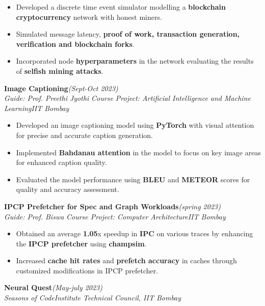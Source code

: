 \documentclass[10 pt]{article}
\begin{document}
		\begin{itemize}[itemsep = -0.8 mm, leftmargin=*]
		\vspace{-16pt}
		\item  Developed a discrete time event simulator modelling a \textbf{blockchain cryptocurrency} network with honest miners.
		\item Simulated message latency, \textbf{proof of work, transaction generation, verification and blockchain forks}.
      \item Incorporated node \textbf{hyperparameters} in the network evaluating the results of \textbf{selfish mining attacks}.
	\end{itemize}
{\selectfont
		\textbf{{Image Captioning}}\hfill{\sl \small (Sept-Oct 2023)}\\
	}{\it Guide: Prof. Preethi Jyothi \textbar} {\it Course Project: Artificial Intelligence and Machine Learning}\hfill{\sl \small IIT Bombay}\\
		\begin{itemize}[itemsep = -0.8 mm, leftmargin=*]
		\vspace{-16pt}
    \item Developed an image captioning model using \textbf{PyTorch} with visual attention for precise and accurate caption generation.
    
    \item Implemented \textbf{Bahdanau attention} in the model to focus on key image areas for enhanced caption quality.
    \item Evaluated the model performance using \textbf{BLEU} and \textbf{METEOR} scores for quality and accuracy assessment.
	\end{itemize}
 {\selectfont
		\textbf{{IPCP Prefetcher for Spec and Graph Workloads}}\hfill{\sl \small (spring 2023)}\\
	}{\it Guide: Prof. Biswa \textbar} {\it Course Project:  Computer Architecture}\hfill{\sl \small IIT Bombay}\\
	\begin{itemize}[itemsep = -0.8 mm, leftmargin=*]
		\vspace{-16pt}
		\item Obtained an average \textbf{1.05}x speedup in \textbf{IPC} on various traces by enhancing the \textbf{IPCP prefetcher} using \textbf{champsim}.
		\item Increased \textbf{cache hit rates} and \textbf{prefetch accuracy} in caches through customized modifications in IPCP prefetcher.
	\end{itemize}
{\selectfont
		\textbf{{Neural Quest}}\hfill{\sl \small (May-july 2023)}\\
	}{\it Seasons of Code}\hfill{\sl \small Institute Technical Council, IIT Bombay}\\
\end{document}
